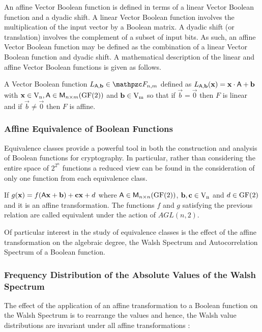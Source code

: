 An affine Vector Boolean function is defined in terms of a linear Vector Boolean function and a dyadic shift. A linear Vector Boolean function involves the multiplication of the input vector by a Boolean matrix. A dyadic shift (or translation) involves the complement of a subset of input bits. As such, an affine Vector Boolean function may be defined as the combination of a linear Vector Boolean function and dyadic shift.  A mathematical description of the linear and affine Vector Boolean functions is given as follows.

\begin{definition}
A Vector Boolean function $L_{\matr{A},\vec{b}} \in \funct{F}_{n,m}$ defined as $L_{\matr{A},\vec{b}}(\vec{x}) = \vec{x} \cdot \matr{A} + \vec{b}$ with $\vec{x} \in \gf{V_n}, \matr{A} \in \matr{M}_{n \times m}(\gf{GF(2)})$ and $\vec{b} \in \gf{V_m}$ so that if $\vec{b} = \vec{0}$ then $F$ is linear and if $\vec{b} \neq \vec{0}$ then $F$ is affine.
\end{definition}

\subsubsection{Affine Equivalence of Boolean Functions}\label{sec:AffineEquivalenceBF}

Equivalence classes provide a powerful tool in both the construction and analysis of Boolean functions for cryptography. In particular, rather than considering the entire space of $2^{2^n}$ functions a reduced view can be found in the consideration of only one function from each equivalence class. 

If $g(\vec{x}) = f(\matr{A} \vec{x} + \vec{b}) + \vec{c}\vec{x}+d$ where $\matr{A}  \in \matr{M}_{n \times n}(\gf{GF(2)})$, $\vec{b}, \vec{c} \in \gf{V_n}$  and $d \in \gf{GF(2)}$ and it is an affine transformation. The functions $f$ and $g$ satisfying the previous relation are called equivalent under the action of $AGL(n, 2)$. 

Of particular interest in the study of equivalence classes is the effect of the affine transformation on the algebraic degree, the Walsh Spectrum and Autocorrelation Spectrum of a Boolean function.

\subsubsection{Frequency Distribution of the Absolute Values of the Walsh Spectrum}

The effect of the application of an affine transformation to a Boolean function on the Walsh Spectrum is to rearrange the values and hence, the Walsh value distributions are invariant under all affine transformations \cite{Preneel:93}:

